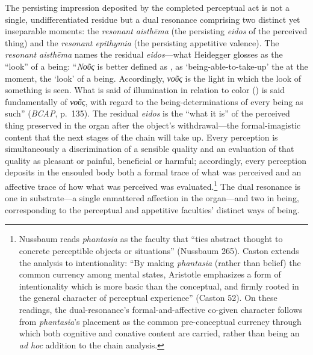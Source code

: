 The persisting impression deposited by the completed perceptual act is not a single, undifferentiated residue but a dual resonance comprising two distinct yet inseparable moments: the \textit{resonant aisthēma} (the persisting \textit{eidos} of the perceived thing) and the \textit{resonant epithymia} (the persisting appetitive valence). The \textit{resonant aisthēma} names the residual \textit{eidos}---what Heidegger glosses as the ``look'' of a being: ``\textit{Νοῦς} is better defined as , as `being-able-to-take-up' the  at the moment, the `look' of a being. Accordingly, \textit{νοῦς} is the light in which the look of something is seen. What is said of illumination in relation to color () is said fundamentally of \textit{νοῦς}, with regard to the being-determinations of every being as such'' (\textit{BCAP}, p.~135). The residual \textit{eidos} is the ``what it is'' of the perceived thing preserved in the organ after the object's withdrawal---the formal-imagistic content that the next stages of the chain will take up. Every perception is simultaneously a discrimination of a sensible quality and an evaluation of that quality as pleasant or painful, beneficial or harmful; accordingly, every perception deposits in the ensouled body both a formal trace of what was perceived and an affective trace of how what was perceived was evaluated.\footnote{Nussbaum reads \textit{phantasia} as the faculty that ``ties abstract thought to concrete perceptible objects or situations'' (Nussbaum 265). Caston extends the analysis to intentionality: ``By making \textit{phantasia} (rather than belief) the common currency among mental states, Aristotle emphasizes a form of intentionality which is more basic than the conceptual, and firmly rooted in the general character of perceptual experience'' (Caston 52). On these readings, the dual-resonance's formal-and-affective co-given character follows from \textit{phantasia}'s placement as the common pre-conceptual currency through which both cognitive and conative content are carried, rather than being an \textit{ad hoc} addition to the chain analysis.} The dual resonance is one in substrate---a single enmattered affection in the organ---and two in being, corresponding to the perceptual and appetitive faculties' distinct ways of being.

